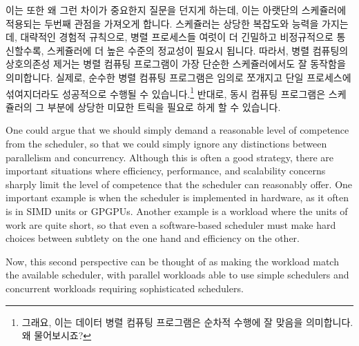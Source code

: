 이는 또한 왜 그런 차이가 중요한지 질문을 던지게 하는데, 이는 아랫단의
스케쥴러에 적용되는 두번째 관점을 가져오게 합니다.
스케쥴러는 상당한 복잡도와 능력을 가지는데, 대략적인 경험적 규칙으로, 병렬
프로세스들 여럿이 더 긴밀하고 비정규적으로 통신할수록, 스케쥴러에 더 높은
수준의 정교성이 필요시 됩니다.
따라서, 병렬 컴퓨팅의 상호의존성 제거는 병렬 컴퓨팅 프로그램이 가장 단순한
스케쥴러에서도 잘 동작함을 의미합니다.
실제로, 순수한 병렬 컴퓨팅 프로그램은 임의로 쪼개지고 단일 프로세스에
섞여지더라도 성공적으로 수행될 수 있습니다.\footnote{
	그래요, 이는 데이터 병렬 컴퓨팅 프로그램은 순차적 수행에 잘 맞음을
	의미합니다.
	왜 물어보시죠?}
반대로, 동시 컴퓨팅 프로그램은 스케쥴러의 그 부분에 상당한 미묘한 트릭을 필요로
하게 할 수 있습니다.

\iffalse

This of course begs the question of why such a distinction matters,
which brings us to the second perspective, that of the underlying scheduler.
Schedulers come in a wide range of complexities and capabilities, and
as a rough rule of thumb, the more tightly and irregularly a set of
parallel processes communicate, the higher the level of sophistication
required from the scheduler.
As such, parallel computing's avoidance of interdependencies means that
parallel-computing programs run well on the least-capable schedulers.
In fact, a pure parallel-computing program can run successfully after
being arbitrarily subdivided and interleaved onto a uniprocessor.\footnote{
	Yes, this does mean that data-parallel-computing programs are
	best-suited for sequential execution.
	Why did you ask?}
In contrast, concurrent-computing programs might well require extreme
subtlety on the part of the scheduler.

\fi

One could argue that we should simply demand a reasonable level of
competence from the scheduler, so that we could simply ignore any
distinctions between parallelism and concurrency.
Although this is often a good strategy,
there are important situations where efficiency,
performance, and scalability concerns sharply limit the level
of competence that the scheduler can reasonably offer.
One important example is when the scheduler is implemented in
hardware, as it often is in SIMD units or GPGPUs.
Another example is a workload where the units of work are quite
short, so that even a software-based scheduler must make hard choices
between subtlety on the one hand and efficiency on the other.

Now, this second perspective can be thought of as making the workload
match the available scheduler, with parallel workloads able to
use simple schedulers and concurrent workloads requiring
sophisticated schedulers.

